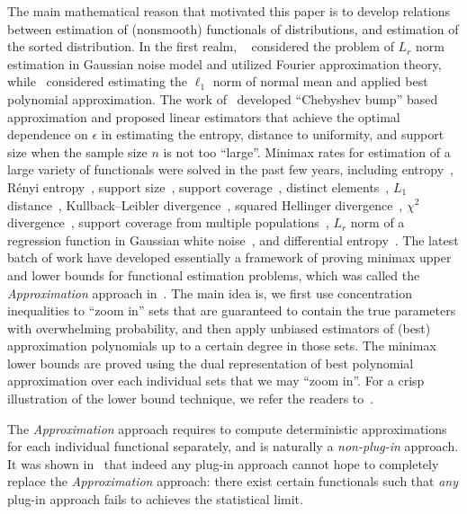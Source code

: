\documentclass[final,12pt]{colt2018} %
\begin{document}
The main mathematical reason that motivated this paper is to develop relations between estimation of (nonsmooth) functionals of distributions, and estimation of the sorted distribution. In the first realm, ~\cite{Lepski--Nemirovski--Spokoiny1999estimation} considered the problem of $L_r$ norm estimation in Gaussian noise model and utilized Fourier approximation theory, while~\cite{Cai--Low2011} considered estimating the $\ell_1$ norm of normal mean and applied best polynomial approximation. The work of~\cite{Valiant--Valiant2011power} developed ``Chebyshev bump'' based approximation and proposed linear estimators that achieve the optimal dependence on $\epsilon$ in estimating the entropy, distance to uniformity, and support size when the sample size $n$ is not too ``large''. Minimax rates for estimation of a large variety of functionals were solved in the past few years, including entropy~\cite{wu2016minimax,Jiao--Venkat--Han--Weissman2015minimax}, R\'enyi entropy~\cite{Acharya--Orlitsky--Suresh--Tyagi2014complexity}, support size~\cite{wu2015chebyshev}, support coverage~\cite{orlitsky2016optimal}, distinct elements~\cite{wu2016sample}, $L_1$ distance~\cite{jiao2016minimax}, Kullback--Leibler divergence~\cite{bu2016estimation,Han--Jiao--Weissman2016minimaxdivergence}, squared Hellinger divergence~\cite{Han--Jiao--Weissman2016minimaxdivergence}, $\chi^2$ divergence~\cite{Han--Jiao--Weissman2016minimaxdivergence}, support coverage from multiple populations~\cite{raghunathan2017estimating}, $L_r$ norm of a regression function in Gaussian white noise~\cite{Han--Jiao--Mukherjee--Weissman2017adaptive}, and differential entropy~\cite{han-jiao-weissman-wu2017minimax}. The latest batch of work have developed essentially a framework of proving minimax upper and lower bounds for functional estimation problems, which was called the \emph{Approximation} approach in~\cite{Jiao--Venkat--Han--Weissman2015minimax}. The main idea is, we first use concentration inequalities to ``zoom in'' sets that are guaranteed to contain the true parameters with overwhelming probability, and then apply unbiased estimators of (best) approximation polynomials up to a certain degree in those sets. The minimax lower bounds are proved using the dual representation of best polynomial approximation over each individual sets that we may ``zoom in''. For a crisp illustration of the lower bound technique, we refer the readers to~\cite{jiao2017minimax}. 

The \emph{Approximation} approach requires to compute deterministic approximations for each individual functional separately, and is naturally a \emph{non-plug-in} approach. It was shown in~\cite{jiao2017minimax} that indeed any plug-in approach cannot hope to completely replace the \emph{Approximation} approach: there exist certain functionals such that \emph{any} plug-in approach fails to achieves the statistical limit. 
\end{document}
